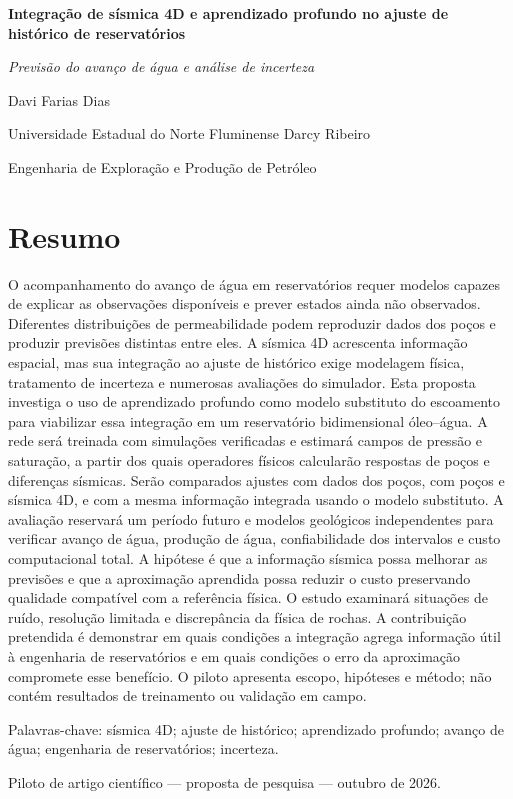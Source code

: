 \documentclass[12pt,a4paper]{article}
\begin{document}
{\noindent\bfseries\fontsize{16}{19}\selectfont Integração de sísmica 4D e aprendizado profundo no ajuste de histórico de reservatórios\par}
\begin{center}\large\itshape Previsão do avanço de água e análise de incerteza\end{center}
Davi Farias Dias\par
Universidade Estadual do Norte Fluminense Darcy Ribeiro\par
Engenharia de Exploração e Produção de Petróleo\par
\section*{Resumo}
O acompanhamento do avanço de água em reservatórios requer modelos capazes de explicar as observações disponíveis e prever estados ainda não observados. Diferentes distribuições de permeabilidade podem reproduzir dados dos poços e produzir previsões distintas entre eles. A sísmica 4D acrescenta informação espacial, mas sua integração ao ajuste de histórico exige modelagem física, tratamento de incerteza e numerosas avaliações do simulador. Esta proposta investiga o uso de aprendizado profundo como modelo substituto do escoamento para viabilizar essa integração em um reservatório bidimensional óleo--água. A rede será treinada com simulações verificadas e estimará campos de pressão e saturação, a partir dos quais operadores físicos calcularão respostas de poços e diferenças sísmicas. Serão comparados ajustes com dados dos poços, com poços e sísmica 4D, e com a mesma informação integrada usando o modelo substituto. A avaliação reservará um período futuro e modelos geológicos independentes para verificar avanço de água, produção de água, confiabilidade dos intervalos e custo computacional total. A hipótese é que a informação sísmica possa melhorar as previsões e que a aproximação aprendida possa reduzir o custo preservando qualidade compatível com a referência física. O estudo examinará situações de ruído, resolução limitada e discrepância da física de rochas. A contribuição pretendida é demonstrar em quais condições a integração agrega informação útil à engenharia de reservatórios e em quais condições o erro da aproximação compromete esse benefício. O piloto apresenta escopo, hipóteses e método; não contém resultados de treinamento ou validação em campo.\par
Palavras-chave: sísmica 4D; ajuste de histórico; aprendizado profundo; avanço de água; engenharia de reservatórios; incerteza.\par
Piloto de artigo científico --- proposta de pesquisa --- outubro de 2026.\par
\end{document}
